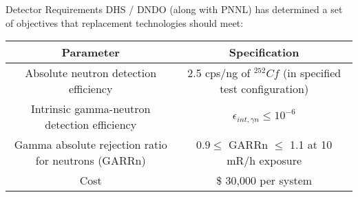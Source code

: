 \begin{frame}{Detector Requirements}
DHS / DNDO (along with PNNL) has determined a set of objectives that replacement technologies should meet:
\begin{table}
	\tiny
	\begin{tabular}{c c }
	Parameter & Specification \\
	\hline
	\hline
	Absolute neutron detection efficiency & 2.5 cps/ng of ${}^{252}Cf$ (in specified test configuration) \\
	Intrinsic gamma-neutron detection efficiency & $ \epsilon_{int,\gamma n}\leq 10^{-6}$ \\
	Gamma absolute rejection ratio for neutrons (GARRn) & $ 0.9 \leq \text{ GARRn }\leq$ 1.1 at 10 mR/h exposure \\
	Cost &  \$ 30,000 per system \\
	\hline
	\end{tabular}
\end{table}
\end{frame}



